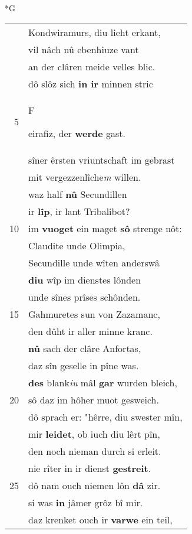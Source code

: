 \documentclass[8pt,a4paper,notitlepage]{article}
\begin{document}
\newpage
\begin{table}[ht]
\begin{minipage}[t]{0.5\linewidth}
\small
\begin{center}*G
\end{center}
\begin{tabular}{rl}
 & Kondwiramurs, diu lieht erkant,\\ 
 & vil nâch nû ebenhiuze vant\\ 
 & an der clâren meide velles blic.\\ 
 & dô slôz sich \textbf{in ir} minnen stric\\ 
5 & \begin{large}F\end{large}eirafiz, der \textbf{werde} gast.\\ 
 & sîner êrsten vriuntschaft im gebrast\\ 
 & mit vergezzenlîche\textit{m} willen.\\ 
 & waz half \textbf{nû} Secundillen\\ 
 & ir \textbf{lîp}, ir lant Tribalibot?\\ 
10 & im \textbf{vuoget} ein maget \textbf{sô} strenge nôt:\\ 
 & Claudite unde Olimpia,\\ 
 & Secundille unde wîten anderswâ\\ 
 & \textbf{diu} wîp im dienstes lônden\\ 
 & unde sînes prîses schônden.\\ 
15 & Gahmuretes sun von Zazamanc,\\ 
 & den dûht ir aller minne kranc.\\ 
 & \textbf{nû} sach der clâre Anfortas,\\ 
 & daz sîn geselle in pîne was.\\ 
 & \textbf{des} blank\textit{iu} mâl \textbf{gar} wurden bleich,\\ 
20 & sô daz im hôher muot gesweich.\\ 
 & dô sprach er: "hêrre, diu swester mîn,\\ 
 & mir \textbf{leidet}, ob iuch diu lêrt pîn,\\ 
 & den noch nieman durch si erleit.\\ 
 & nie rîter in ir dienst \textbf{gestreit}.\\ 
25 & dô nam ouch niemen lôn \textbf{dâ} zir.\\ 
 & si was \textbf{in} jâmer grôz bî mir.\\ 
 & daz krenket ouch ir \textbf{varwe} ein teil,\\ 

\end{tabular}
\end{minipage}
\end{table}
\end{document}
